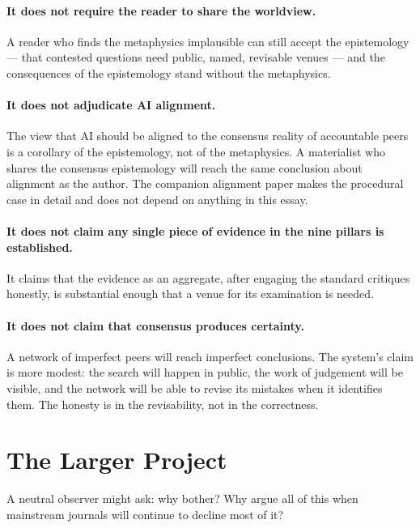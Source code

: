 \documentclass[11pt,a4paper]{article}
\begin{document}
\paragraph{It does not require the reader to share the worldview.}
A reader who finds the metaphysics implausible can still accept
the epistemology --- that contested questions need public,
named, revisable venues --- and the consequences of the
epistemology stand without the metaphysics.

\paragraph{It does not adjudicate AI alignment.} The view that AI
should be aligned to the consensus reality of accountable peers is
a corollary of the epistemology, not of the metaphysics. A
materialist who shares the consensus epistemology will reach the
same conclusion about alignment as the author. The companion
alignment paper makes the procedural case in detail and does not
depend on anything in this essay.

\paragraph{It does not claim any single piece of evidence in the
nine pillars is established.} It claims that the evidence as an
aggregate, after engaging the standard critiques honestly, is
substantial enough that a venue for its examination is needed.

\paragraph{It does not claim that consensus produces certainty.}
A network of imperfect peers will reach imperfect conclusions.
The system's claim is more modest: the search will happen in
public, the work of judgement will be visible, and the network
will be able to revise its mistakes when it identifies them. The
honesty is in the revisability, not in the correctness.

\section{The Larger Project}

A neutral observer might ask: why bother? Why argue all of this
when mainstream journals will continue to decline most of it?
\end{document}
